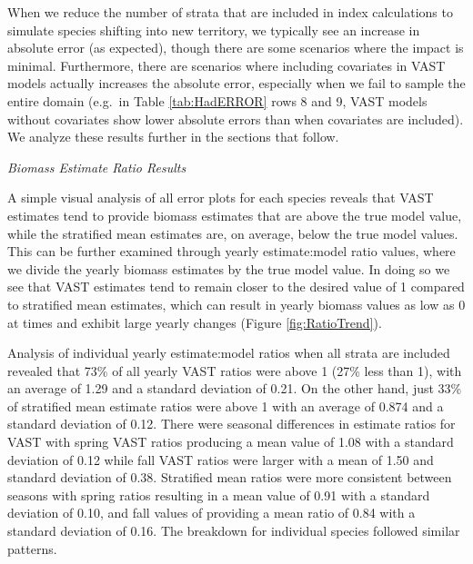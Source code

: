 \documentclass[
  12pt,
]{article}
\begin{document}
When we reduce the number of strata that are included in index calculations to simulate species shifting into new territory, we typically see an increase in absolute error (as expected), though there are some scenarios where the impact is minimal. Furthermore, there are scenarios where including covariates in VAST models actually increases the absolute error, especially when we fail to sample the entire domain (e.g.~in Table \ref{tab:HadERROR} rows 8 and 9, VAST models without covariates show lower absolute errors than when covariates are included). We analyze these results further in the sections that follow.

\emph{Biomass Estimate Ratio Results}

A simple visual analysis of all error plots for each species reveals that VAST estimates tend to provide biomass estimates that are above the true model value, while the stratified mean estimates are, on average, below the true model values. This can be further examined through yearly estimate:model ratio values, where we divide the yearly biomass estimates by the true model value. In doing so we see that VAST estimates tend to remain closer to the desired value of 1 compared to stratified mean estimates, which can result in yearly biomass values as low as 0 at times and exhibit large yearly changes (Figure \ref{fig:RatioTrend}).

Analysis of individual yearly estimate:model ratios when all strata are included revealed that 73\% of all yearly VAST ratios were above 1 (27\% less than 1), with an average of 1.29 and a standard deviation of 0.21. On the other hand, just 33\% of stratified mean estimate ratios were above 1 with an average of 0.874 and a standard deviation of 0.12. There were seasonal differences in estimate ratios for VAST with spring VAST ratios producing a mean value of 1.08 with a standard deviation of 0.12 while fall VAST ratios were larger with a mean of 1.50 and standard deviation of 0.38. Stratified mean ratios were more consistent between seasons with spring ratios resulting in a mean value of 0.91 with a standard deviation of 0.10, and fall values of providing a mean ratio of 0.84 with a standard deviation of 0.16. The breakdown for individual species followed similar patterns.
\end{document}
